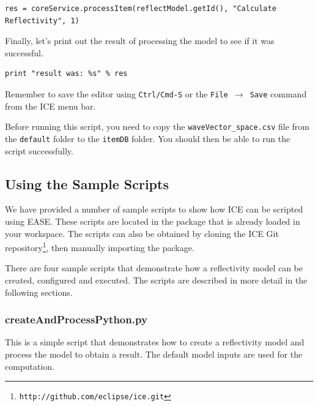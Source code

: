 {\small
\begin{verbatim}
res = coreService.processItem(reflectModel.getId(), "Calculate Reflectivity", 1)
\end{verbatim}
}

Finally, let's print out the result of processing the model to see if it was
successful.

{\small
\begin{verbatim}
print "result was: %s" % res
\end{verbatim}
}

Remember to save the editor using \texttt{Ctrl/Cmd-S} or the \texttt{File
$\rightarrow$ Save} command from the ICE menu bar.

Before running this script, you need to copy the \texttt{waveVector\_space.csv}
file from the \texttt{default} folder to the \texttt{itemDB} folder. You should
then be able to run the script successfully.

\subsection{Using the Sample Scripts}

\lstset{basicstyle=\ttfamily\scriptsize, breaklines}
\makeatletter
\def\lst@lettertrue{\let\lst@ifletter\iffalse}
\makeatother

We have provided a number of sample scripts to show how ICE can be
scripted using EASE.
These scripts are located in the
 package that is already loaded
in your workspace. The scripts can also be obtained by cloning the ICE Git
repository\footnote{\texttt{http://github.com/eclipse/ice.git}},
then manually importing the 
package.

There are four sample scripts that demonstrate how a reflectivity model
can be created, configured and executed. The scripts are described in
more detail in the following sections.

\subsubsection{createAndProcessPython.py} 

This is a simple script
that demonstrates how to create a reflectivity model and process the model to
obtain a result. The default model inputs are used for the computation.



